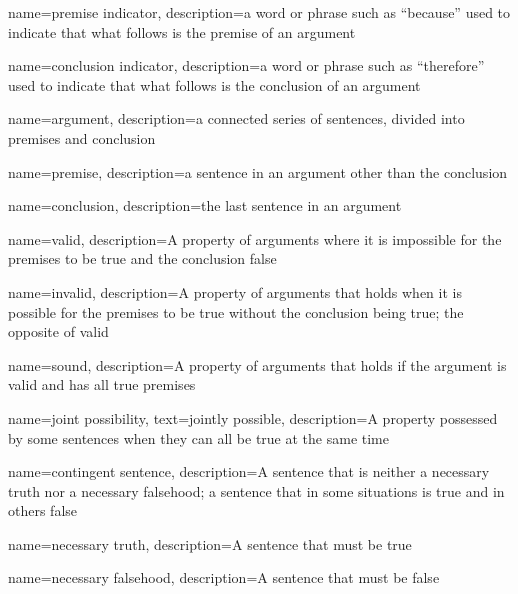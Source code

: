 


{
name=premise indicator,
description={a word or phrase such as ``because'' used to indicate that what follows is the premise of an argument}
}

{
name=conclusion indicator,
description={a word or phrase such as ``therefore'' used to indicate that what follows is the conclusion of an argument}
}

{
name=argument,
description={a connected series of sentences, divided into \gls{premise}s and \gls{conclusion}}
}

{
name=premise,
description={a sentence in an \gls{argument} other than the \gls{conclusion}}
}

{
name=conclusion,
description={the last sentence in an \gls{argument}}
}



{
name=valid,
description={A property of arguments where it is impossible for the premises to be true and the conclusion false}
}

{
name=invalid,
description={A property of arguments that holds when it is possible for the premises to be true without the conclusion being true; the opposite of \gls{valid}}
}

{
name=sound,
description={A property of arguments that holds if the argument is valid and has all true premises}
}



{
name=joint possibility,
text={jointly possible},
description={A property possessed by some sentences when they can all be true at the same time}
}

{
name=contingent sentence,
description={A sentence that is neither a \gls{necessary truth} nor a \gls{necessary falsehood}; a sentence that in some situations is true and in others false}
}

{
name={necessary truth},
description={A sentence that must be true}
}

{
name={necessary falsehood},
description={A sentence that must be false}
}

